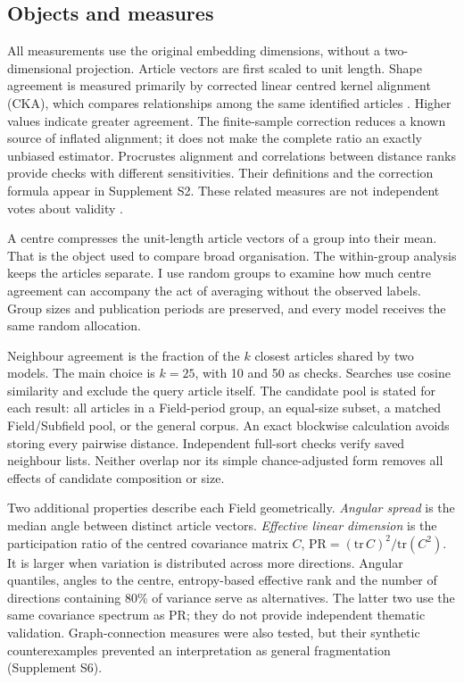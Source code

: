 \documentclass[12pt]{article}
\begin{document}
\subsection{Objects and measures}
All measurements use the original embedding dimensions, without a two-dimensional projection. Article vectors are first scaled to unit length. Shape agreement is measured primarily by corrected linear centred kernel alignment (CKA), which compares relationships among the same identified articles \citep{pmlr-v97-kornblith19a,refa961d84a4e}. Higher values indicate greater agreement. The finite-sample correction reduces a known source of inflated alignment; it does not make the complete ratio an exactly unbiased estimator. Procrustes alignment and correlations between distance ranks provide checks with different sensitivities. Their definitions and the correction formula appear in Supplement S2. These related measures are not independent votes about validity \citep{NEURIPS2021_252a3dba,pmlr-v285-williams24a}.

A centre compresses the unit-length article vectors of a group into their mean. That is the object used to compare broad organisation. The within-group analysis keeps the articles separate. I use random groups to examine how much centre agreement can accompany the act of averaging without the observed labels. Group sizes and publication periods are preserved, and every model receives the same random allocation.

Neighbour agreement is the fraction of the $k$ closest articles shared by two models. The main choice is $k=25$, with 10 and 50 as checks. Searches use cosine similarity and exclude the query article itself. The candidate pool is stated for each result: all articles in a Field-period group, an equal-size subset, a matched Field/Subfield pool, or the general corpus. An exact blockwise calculation avoids storing every pairwise distance. Independent full-sort checks verify saved neighbour lists. Neither overlap nor its simple chance-adjusted form removes all effects of candidate composition or size.

Two additional properties describe each Field geometrically. \emph{Angular spread} is the median angle between distinct article vectors. \emph{Effective linear dimension} is the participation ratio of the centred covariance matrix $C$, $\mathrm{PR}=(\mathrm{tr}\,C)^2/\mathrm{tr}(C^2)$. It is larger when variation is distributed across more directions. Angular quantiles, angles to the centre, entropy-based effective rank and the number of directions containing 80\% of variance serve as alternatives. The latter two use the same covariance spectrum as PR; they do not provide independent thematic validation. Graph-connection measures were also tested, but their synthetic counterexamples prevented an interpretation as general fragmentation (Supplement S6).
\end{document}
